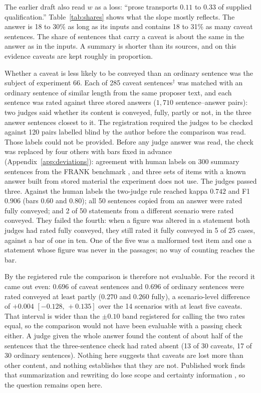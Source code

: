 \documentclass[10pt,twocolumn]{article}
\newcommand{\ci}[2]{\ensuremath{[#1,\,#2]}}
\begin{document}
The earlier draft also read $w$ as a loss: ``prose transports $0.11$ to
$0.33$ of supplied qualification.'' Table~\ref{tab:shares} shows what
the slope mostly reflects. The answer is 18 to 30\% as long as its
inputs and contains 18 to 31\% as many caveat sentences. The share of
sentences that carry a caveat is about the same in the answer as in the
inputs. A summary is shorter than its sources, and on this evidence
caveats are kept roughly in proportion.

Whether a caveat is less likely to be conveyed than an ordinary
sentence was the subject of experiment 66. Each of 285 caveat
sentences$^\dagger$ was matched with an ordinary sentence of similar
length from the same proposer text, and each sentence was rated
against three stored answers ($1{,}710$ sentence--answer pairs): two
judges said whether its content is conveyed, fully, partly or not, in
the three answer sentences closest to it. The registration required the judges to be checked against 120
pairs labelled blind by the author before the comparison was read.
Those labels could not be provided. Before any judge answer was read,
the check was replaced by four others with bars fixed in advance
(Appendix~\ref{app:deviations}): agreement with human labels on 300
summary sentences from the FRANK benchmark \cite{pagnoni2021frank}, and
three sets of items with a known answer built from stored material the
experiment does not use. The judges passed three. Against the human
labels the two-judge rule reached kappa $0.742$ and F1 $0.906$ (bars
$0.60$ and $0.80$); all 50 sentences copied from an answer were rated
fully conveyed; and 2 of 50 statements from a different scenario were
rated conveyed. They failed the fourth: when a figure was altered in a
statement both judges had rated fully conveyed, they still rated it
fully conveyed in 5 of 25 cases, against a bar of one in ten. One of
the five was a malformed test item and one a statement whose figure was
never in the passages; no way of counting reaches the bar.

By the registered rule the comparison is therefore not evaluable. For
the record it came out even: $0.696$ of caveat sentences and $0.696$ of
ordinary sentences were rated conveyed at least partly ($0.270$ and
$0.260$ fully), a scenario-level difference of $+0.004$
\ci{-0.128}{+0.135} over the 14 scenarios with at least five caveats.
That interval is wider than the $\pm0.10$ band registered for calling
the two rates equal, so the comparison would not have been evaluable
with a passing check either. A judge given the whole answer found the
content of about half of the sentences that the three-sentence check
had rated absent (13 of 30 caveats, 17 of 30 ordinary sentences).
Nothing here suggests that caveats are lost more than other content,
and nothing establishes that they are not. Published work finds that
summarization and rewriting do lose scope and certainty information
\cite{peters2025generalization,belem2026may,wang2026facts}, so the
question remains open here.
\end{document}
